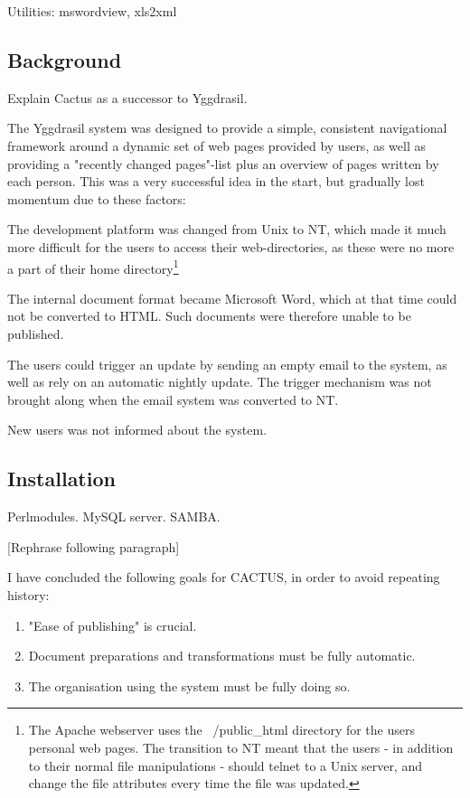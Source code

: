 Utilities:  mswordview, xls2xml

\subsection{Background}



Explain Cactus as a successor to Yggdrasil.

The Yggdrasil system was designed to provide a simple, consistent
navigational framework around a dynamic set of web pages provided by
users, as well as providing a "recently changed pages"-list plus an
overview of pages written by each person.  This was a very successful
idea in the start, but gradually lost momentum due to these factors:

The development platform was changed from Unix to NT, which made it
much more difficult for the users to access their web-directories, as
these were no more a part of their home directory\footnote{The Apache
  webserver uses the ~/public\_html directory for the users personal
  web pages.  The transition to NT meant that the users - in addition
  to their normal file manipulations - should telnet to a Unix server,
  and change the file attributes every time the file was updated.  }

The internal document format became Microsoft Word, which at that time
could not be converted to HTML.  Such documents were therefore unable
to be published.

The users could trigger an update by sending an empty email to the
system, as well as rely on an automatic nightly update.  The trigger
mechanism was not brought along when the email system was converted to
NT.

New users was not informed about the system.

\subsection{Installation}
Perlmodules.  MySQL server. SAMBA.


[Rephrase following paragraph]

I have concluded the following goals for CACTUS, in order to avoid
repeating history:

\begin{enumerate}
\item "Ease of publishing" is crucial.
  
\item Document preparations and transformations must be fully
  automatic.
  
\item The organisation using the system must be fully doing so.

\end{enumerate}

